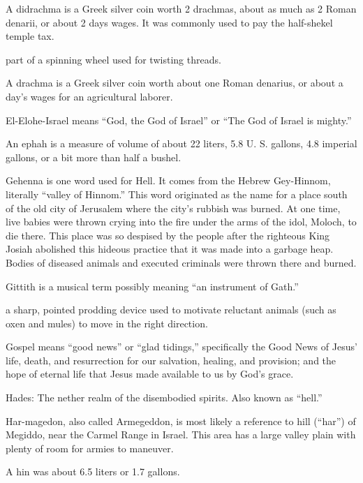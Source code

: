 \begin{multicols}{2}
A didrachma is a Greek silver coin worth 2 drachmas, about as much as
2 Roman denarii, or about 2 days wages. It was commonly used to pay
the half-shekel temple tax.

part of a spinning wheel used for twisting threads.

A drachma is a Greek silver coin worth about one Roman denarius, or
about a day's wages for an agricultural laborer.

El-Elohe-Israel means {``}God, the God of Israel{''} or {``}The God
of Israel is mighty.{''}

An ephah is a measure of volume of about 22 liters, 5.8 U. S.
gallons, 4.8 imperial gallons, or a bit more than half a bushel.

Gehenna is one word used for Hell. It comes from the Hebrew
Gey-Hinnom, literally {``}valley of Hinnom.{''} This word originated
as the name for a place south of the old city of Jerusalem where the
city's rubbish was burned. At one time, live babies were thrown
crying into the fire under the arms of the idol, Moloch, to die
there. This place was so despised by the people after the righteous
King Josiah abolished this hideous practice that it was made into a
garbage heap. Bodies of diseased animals and executed criminals were
thrown there and burned.

Gittith is a musical term possibly meaning {``}an instrument of
Gath.{''}

a sharp, pointed prodding device used to motivate reluctant animals
(such as oxen and mules) to move in the right direction.

Gospel means {``}good news{''} or {``}glad tidings,{''} specifically
the Good News of Jesus' life, death, and resurrection for our
salvation, healing, and provision; and the hope of eternal life that
Jesus made available to us by God's grace.

Hades: The nether realm of the disembodied spirits. Also known as
{``}hell.{''}

Har-magedon, also called Armegeddon, is most likely a reference to
hill ({``}har{''}) of Megiddo, near the Carmel Range in Israel. This
area has a large valley plain with plenty of room for armies to
maneuver.

A hin was about 6.5 liters or 1.7 gallons.


\end{multicols}
